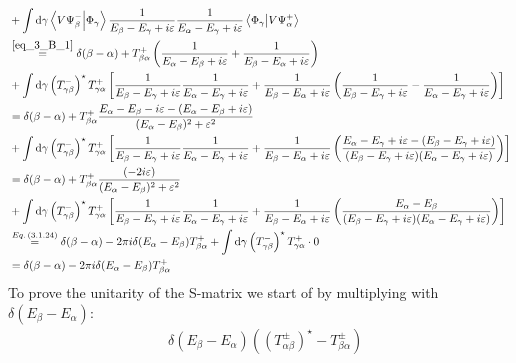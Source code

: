 \begin{widetext}
\begin{align}
		&+\int\dd{\gamma}\braket{V\Psi_\beta^-}{\Phi_\gamma}\dfrac{1}{E_\beta-E_\gamma+ i \varepsilon}\dfrac{1}{E_\alpha-E_\gamma+i \varepsilon}
		\braket{\Phi_\gamma}{V\Psi_\alpha^+}\nonumber\\
		&\overset{\ref{eq_3_B_1}}{=}
		\delta(\beta-\alpha)+ T_{\beta\alpha}^+ \left(\dfrac{1}{E_\alpha-E_\beta+i \varepsilon}+\dfrac{1}{E_\beta-E_\alpha+i \varepsilon}\right)\nonumber\\
		&+\int\dd{\gamma}\left(T_{\gamma\beta}^-\right)^\star T_{\gamma\alpha}^+ \left[\dfrac{1}{E_\beta-E_\gamma+ i \varepsilon}\dfrac{1}{E_\alpha-E_\gamma+i \varepsilon}+\dfrac{1}{E_\beta-E_\alpha+i \varepsilon}
		\left(\dfrac{1}{E_\beta-E_\gamma+ i \varepsilon}-\dfrac{1}{E_\alpha-E_\gamma+ i \varepsilon}\right)\right]\nonumber\\
		&=\delta(\beta-\alpha)+ T_{\beta\alpha}^+ \dfrac{E_\alpha-E_\beta-i \varepsilon-(E_\alpha-E_\beta+i \varepsilon)}{(E_\alpha-E_\beta)^2+\varepsilon^2}\nonumber\\
		&+\int\dd{\gamma}\left(T_{\gamma\beta}^-\right)^\star T_{\gamma\alpha}^+ \left[\dfrac{1}{E_\beta-E_\gamma+ i \varepsilon}\dfrac{1}{E_\alpha-E_\gamma+i \varepsilon}+\dfrac{1}{E_\beta-E_\alpha+i \varepsilon}
		\left(
		\dfrac{E_\alpha-E_\gamma+ i \varepsilon-(E_\beta-E_\gamma+ i \varepsilon)}{(E_\beta-E_\gamma+ i \varepsilon)(E_\alpha-E_\gamma+ i \varepsilon)}
		\right)
		\right]\nonumber\\
		&=\delta(\beta-\alpha)+ T_{\beta\alpha}^+ \dfrac{(-2i \varepsilon)}{(E_\alpha-E_\beta)^2+\varepsilon^2}\nonumber\\
		&+\int\dd{\gamma}\left(T_{\gamma\beta}^-\right)^\star T_{\gamma\alpha}^+ \left[\dfrac{1}{E_\beta-E_\gamma+ i \varepsilon}\dfrac{1}{E_\alpha-E_\gamma+i \varepsilon}+\dfrac{1}{E_\beta-E_\alpha+i \varepsilon}
		\left(
		\dfrac{E_\alpha-E_\beta}{(E_\beta-E_\gamma+ i \varepsilon)(E_\alpha-E_\gamma+ i \varepsilon)}
		\right)
		\right]\nonumber\\
		&\overset{Eq.\,({3.1.24})}{=}\delta(\beta-\alpha)-2\pi i \delta(E_\alpha-E_\beta)T_{\beta\alpha}^++\int\dd{\gamma}\left(T_{\gamma\beta}^-\right)^\star T_{\gamma\alpha}^+\cdot0\nonumber\\
		&=\delta(\beta-\alpha)-2\pi i \delta(E_\alpha-E_\beta)T_{\beta\alpha}^+ \label{eq_3_B_2}
	\end{align}
	To prove the unitarity of the S-matrix we start of by multiplying  with $\delta\left(E_\beta-E_\alpha\right)$:
	\begin{align}
		&\delta\left(E_\beta-E_\alpha\right)\left(\left(T_{\alpha\beta}^\pm\right)^\star-T_{\beta\alpha}^\pm\right)\nonumber\\

\end{align}
\end{widetext}
